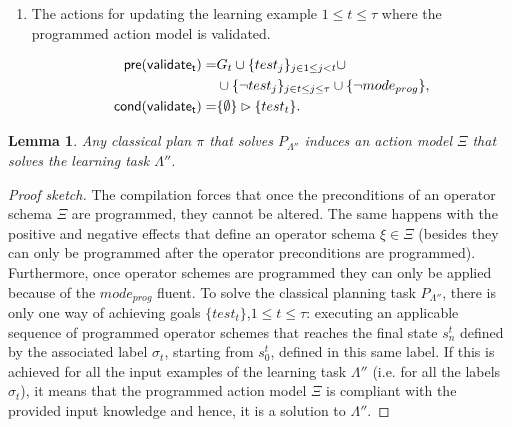 \documentclass[letterpaper]{article} %
\newcommand{\pre}{\mathsf{pre}}     %
\newcommand{\cond}{\mathsf{cond}}   %
\newtheorem{lemma}[theorem]{Lemma}
\begin{document}
\begin{itemize}
\begin{enumerate}
\item The actions for updating the learning example {\tt\small $1\leq t\leq \tau$} where the programmed action model is validated. 
\begin{small}
\begin{align*}
\hspace*{7pt}\pre(\mathsf{validate_{t}})=&G_t\cup\{test_j\}_{j\in 1\leq j<t}\cup\\
&\cup\{\neg test_j\}_{j\in t\leq j\leq \tau}\cup \{\neg mode_{prog}\},\\
\cond(\mathsf{validate_{t}})=&\{\emptyset\}\rhd\{test_t\}.
\end{align*}
\end{small}
\end{enumerate}
\end{itemize}


\begin{lemma}
Any classical plan $\pi$ that solves $P_{\Lambda''}$ induces an action model $\Xi$ that solves the learning task $\Lambda''$.
\end{lemma}
\begin{small}
\begin{proof}[Proof sketch]
The compilation forces that once the preconditions of an operator schema $\Xi$ are programmed, they cannot be altered. The same happens with the positive and negative effects that define an operator schema $\xi \in \Xi$ (besides they can only be programmed after the operator preconditions are programmed). Furthermore, once operator schemes are programmed they can only be applied because of the $mode_{prog}$ fluent. To solve the classical planning task $P_{\Lambda''}$, there is only one way of achieving goals $\{test_t\}$,{\small $1\leq t\leq \tau$}: executing an applicable sequence of programmed operator schemes that reaches the final state $s_n^t$ defined by the associated label $\sigma_t$, starting from $s_0^t$, defined in this same label. If this is achieved for all the input examples of the learning task $\Lambda''$ (i.e. for all the labels $\sigma_t$), it means that the programmed action model $\Xi$ is compliant with the provided input knowledge and hence, it is a solution to $\Lambda''$.
 \end{proof}
\end{small}
\end{document}
